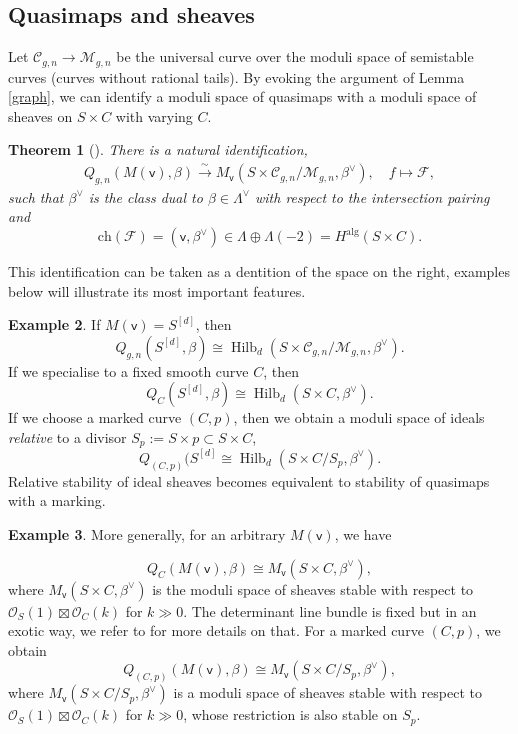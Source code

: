 \documentclass[11pt, reqno]{amsart}
\theoremstyle{plain}
\newtheorem{thm}{Theorem}[section]
\theoremstyle{definition}
\newtheorem{example}[thm]{Example}
\theoremstyle{remark}
\newcommand{\CC}{{\mathcal C}}
\newcommand{\CF}{{\mathcal F}}
\newcommand{\CM}{{\mathcal M}}
\newcommand{\CO}{{\mathcal O}}
\newcommand{\vsf}{{\mathsf{v}}}
\newcommand{\ch}{{\mathrm{ch}}}
\DeclareMathOperator{\Hilb}{Hilb}
\begin{document}
\subsection{Quasimaps and sheaves} 
 Let $\CC_{g,n} \rightarrow \CM_{g,n}$ be the universal curve over the moduli space of semistable curves (curves without rational tails). By evoking the argument of Lemma \ref{graph}, we can identify a moduli space of quasimaps with a moduli space of sheaves on $S\times C$ with varying $C$. 
 \begin{thm}[\vspace{-0.2cm}\cite{N}]\label{ident} There is a natural identification, 
 	\begin{align*}
 	Q_{g,n}(M(\vsf),\beta) \xrightarrow{\sim} M_\vsf(S\times \CC_{g,n}/ \CM_{g,n}, \beta^\vee), \quad f \mapsto \CF,
 	\end{align*}
 such that $\beta^\vee $ is the class dual to $\beta \in \Lambda^\vee$ with respect to the intersection pairing and 
 \[ \ch(\CF)= (\vsf, \beta^\vee ) \in \Lambda  \oplus \Lambda(-2)= H^{\mathrm{alg}}(S\times C).\] 
 	\end{thm}
 This identification can be taken as a dentition of the space on the right, examples below will illustrate its most important features.  

\begin{example} If $M(\vsf)=S^{[d]}$, then 
	\[ 	Q_{g,n}(S^{[d]},\beta)  \cong \Hilb_d(S\times \CC_{g,n}/ \CM_{g,n}, \beta^\vee).\]
If we specialise to a fixed smooth curve $C$, then 
		\[ Q_{C}(S^{[d]},\beta) \cong \Hilb_d(S\times C, \beta^\vee).\] 
If we choose a marked curve $(C,p)$, then we obtain a moduli space of ideals \textit{relative} to a divisor $S_p:=S\times p \subset S\times C$,
		\[ Q_{(C,p)}(S^{[d]} \cong \Hilb_d(S\times C/ S_p, \beta^\vee).\]
Relative stability of ideal sheaves  becomes equivalent to stability of quasimaps with a marking. 
	\end{example}
\begin{example} \label{exmp1}
More generally, for an arbitrary $M(\vsf)$, we have 
 
	\[Q_{C}(M(\vsf),\beta)  \cong M_
\vsf(S\times C,\beta^\vee),\]
	where $M_\vsf(S\times C,\beta^\vee)$ is the moduli space of sheaves stable with respect to $\CO_S(1)\boxtimes\CO_C(k)$ for $k\gg 0$. The determinant line bundle is fixed but in an exotic way, we refer to \cite[Lemma 3.15]{N} for more details on that. For a marked curve $(C,p)$, we obtain 
	\[ Q_{(C,p)}(M(\vsf),\beta) \cong M_\vsf(S\times C/ S_p, \beta^\vee),\]
where  $M_\vsf(S\times C/ S_p, \beta^\vee)$ is a moduli space of sheaves stable with respect to $\CO_S(1)\boxtimes\CO_C(k)$ for $k\gg 0$, whose restriction is also stable on $S_p$.  
	\end{example}
\end{document}
